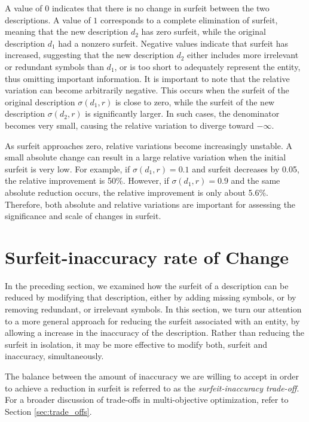 A value of $0$ indicates that there is no change in surfeit between the two descriptions. A value of $1$ corresponds to a complete elimination of surfeit, meaning that the new description $d_2$ has zero surfeit, while the original description $d_1$ had a nonzero surfeit. Negative values indicate that surfeit has increased, suggesting that the new description $d_2$ either includes more irrelevant or redundant symbols than $d_1$, or is too short to adequately represent the entity, thus omitting important information. It is important to note that the relative variation can become arbitrarily negative. This occurs when the surfeit of the original description $\sigma(d_1, r)$ is close to zero, while the surfeit of the new description $\sigma(d_2, r)$ is significantly larger. In such cases, the denominator becomes very small, causing the relative variation to diverge toward $-\infty$.

As surfeit approaches zero, relative variations become increasingly unstable. A small absolute change can result in a large relative variation when the initial surfeit is very low. For example, if $\sigma(d_1, r) = 0.1$ and surfeit decreases by 0.05, the relative improvement is 50\%. However, if $\sigma(d_1, r) = 0.9$ and the same absolute reduction occurs, the relative improvement is only about 5.6\%. Therefore, both absolute and relative variations are important for assessing the significance and scale of changes in surfeit.

%
%

\section{Surfeit-inaccuracy rate of Change}

In the preceding section, we examined how the surfeit of a description can be reduced by modifying that description, either by adding missing symbols, or by removing redundant, or irrelevant symbols. In this section, we turn our attention to a more general approach for reducing the surfeit associated with an entity, by allowing a increase in the inaccuracy of the description. Rather than reducing the surfeit in isolation, it may be more effective to modify both, surfeit and inaccuracy, simultaneously.

The balance between the amount of inaccuracy we are willing to accept in order to achieve a reduction in surfeit is referred to as the \emph{surfeit-inaccuracy trade-off}. For a broader discussion of trade-offs in multi-objective optimization, refer to Section \ref{sec:trade_offs}.

